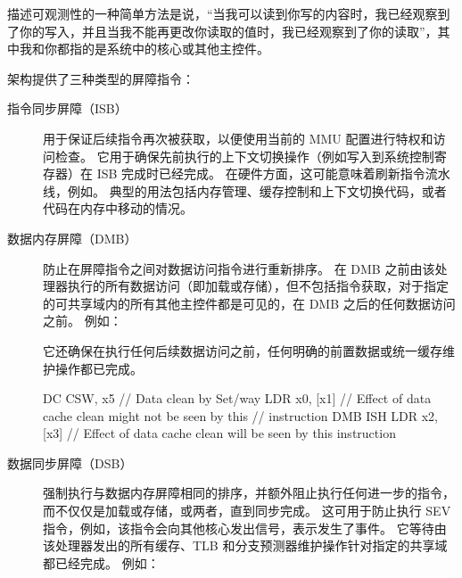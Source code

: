 描述可观测性的一种简单方法是说，“当我可以读到你写的内容时，我已经观察到了你的写入，并且当我不能再更改你读取的值时，我已经观察到了你的读取”，其中我和你都指的是系统中的核心或其他主控件。

架构提供了三种类型的屏障指令：

\begin{description}
  \item [指令同步屏障（ISB）] 用于保证后续指令再次被获取，以便使用当前的 MMU 配置进行特权和访问检查。
  它用于确保先前执行的上下文切换操作（例如写入到系统控制寄存器）在 ISB 完成时已经完成。
  在硬件方面，这可能意味着刷新指令流水线，例如。
  典型的用法包括内存管理、缓存控制和上下文切换代码，或者代码在内存中移动的情况。
  \item [数据内存屏障（DMB）] 防止在屏障指令之间对数据访问指令进行重新排序。
  在 DMB 之前由该处理器执行的所有数据访问（即加载或存储），但不包括指令获取，对于指定的可共享域内的所有其他主控件都是可见的，在 DMB 之后的任何数据访问之前。
    例如：

    它还确保在执行任何后续数据访问之前，任何明确的前置数据或统一缓存维护操作都已完成。

    \begin{lstcode}
      DC CSW, x5   // Data clean by Set/way
      LDR x0, [x1] // Effect of data cache clean might not be seen by this
                   // instruction
      DMB ISH
      LDR x2, [x3] // Effect of data cache clean will be seen by this
      instruction
    \end{lstcode}
  \item [数据同步屏障（DSB）] 强制执行与数据内存屏障相同的排序，并额外阻止执行任何进一步的指令，而不仅仅是加载或存储，或两者，直到同步完成。
  这可用于防止执行 SEV 指令，例如，该指令会向其他核心发出信号，表示发生了事件。
  它等待由该处理器发出的所有缓存、TLB 和分支预测器维护操作针对指定的共享域都已经完成。
    例如：
\end{description}

